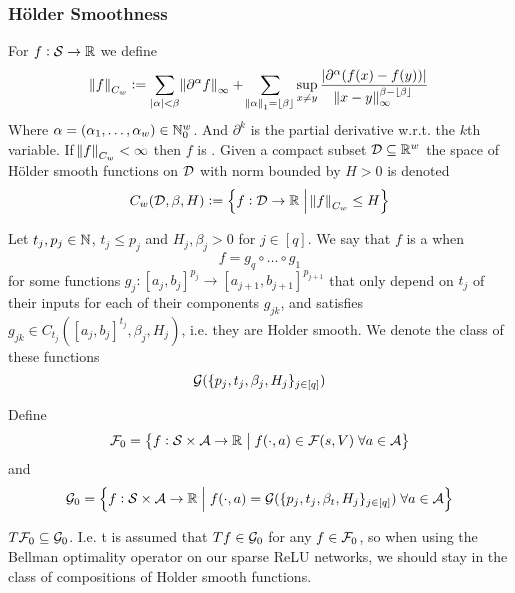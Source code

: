

\subsubsection{Hölder Smoothness} %
\begin{defn}
  For $f : \mathcal{S} \to \mathbb{R}$ we define
  \begin{equation}
    \norm{f}_{C_w} \vcentcolon= 
    \sum_{|{\alpha}| < \beta}
    \norm{\partial^{\alpha}f}_\infty +
    \sum_{\norm{{\alpha}}_1 = \lfloor\beta\rfloor}
    \sup_{x \neq y} \frac{|\partial^\alpha (f(x) - f(y))|}
  {\norm{x-y}_\infty^{\beta-\lfloor\beta\rfloor}}
  \end{equation}
  Where $\alpha = (\alpha_1, \dots, \alpha_w) \in \mathbb{N}_0^w$.
  And $\partial^k$ is the partial derivative w.r.t. the $k$th variable.
  If $\norm{f}_{C_w} < \infty$ then $f$ is .
  Given a compact subset $\mathcal{D} \subseteq \mathbb{R}^w$
  the space of Hölder smooth functions on $\mathcal{D}$ with norm bounded by
  $H > 0$ is denoted
  \[ C_w(\mathcal{D}, \beta, H) \vcentcolon=
  \left\{ f : \mathcal{D} \to \mathbb{R} \;\middle\vert\; \norm{f}_{C_w} \leq H \right\} \]
\end{defn}

\begin{defn}
  Let $t_j, p_j \in \mathbb{N}$, $t_j\leq p_j$ and $H_j, \beta_j > 0$ for $j \in [q]$.
  We say that $f$ is a  when
  \[ f = g_q \circ \dots \circ g_1 \]
  for some functions $g_j : [a_j, b_j]^{p_j} \to [a_{j+1}, b_{j+1}]^{p_{j+1}}$
  that only depend on $t_j$ of their inputs
  for each of their components $g_{jk}$,
  and satisfies $g_{jk} \in C_{t_j}([a_j, b_j]^{t_j}, \beta_j, H_j)$, 
  i.e. they are Holder smooth.
  We denote the class of these functions
  \[ \mathcal{G}(\{p_j, t_j, \beta_j, H_j\}_{j \in [q]}) \]
\end{defn}

\begin{defn}
  Define
  \[ \mathcal{F}_0 = \left\{ f : \mathcal{S} \times \mathcal{A} \to \mathbb{R} \;\middle\vert\;
  f(\cdot, a) \in \mathcal{F}(s, V) \; \forall a \in \mathcal{A} \right\} \]
  and
  \[ \mathcal{G}_0 = \left\{ f : \mathcal{S} \times \mathcal{A} \to \mathbb{R}
      \;\middle\vert\; f(\cdot, a) = \mathcal{G}(\{p_j, t_j, \beta_t, H_j\}_{j \in [q]})
  \; \forall a \in \mathcal{A} \right\} \]
\end{defn}

\begin{asm}\label{asm:A1}
  $ T \mathcal{F}_0 \subseteq \mathcal{G}_0$.
  I.e. t is assumed that $T f \in \mathcal{G}_0$ for any $f \in \mathcal{F}_0$, 
  so when using the Bellman optimality operator on our sparse ReLU networks,
  we should stay in the class of compositions of Holder smooth functions.
\end{asm}

